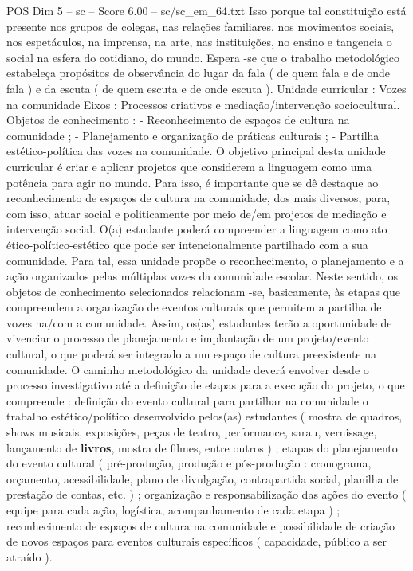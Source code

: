 \begin{textsample}{POS Dim 5 – sc – Score 6.00 – sc/sc\_em\_64.txt}
Isso porque tal constituição está presente nos grupos de colegas, nas relações familiares, nos movimentos sociais, nos espetáculos, na imprensa, na arte, nas instituições, no ensino e tangencia o social na esfera do cotidiano, do mundo.
Espera -se que o trabalho metodológico estabeleça propósitos de observância do lugar da fala ( de quem fala e de onde fala ) e da escuta ( de quem escuta e de onde escuta ).
Unidade curricular : Vozes na comunidade Eixos : Processos criativos e mediação/intervenção sociocultural.
Objetos de conhecimento : - Reconhecimento de espaços de cultura na comunidade ; - Planejamento e organização de práticas culturais ; - Partilha estético-política das vozes na comunidade.
O objetivo principal desta unidade curricular é criar e aplicar projetos que considerem a linguagem como uma potência para agir no mundo.
Para isso, é importante que se dê destaque ao reconhecimento de espaços de cultura na comunidade, dos mais diversos, para, com isso, atuar social e politicamente por meio de/em projetos de mediação e intervenção social.
O(a) estudante poderá compreender a linguagem como ato ético-político-estético que pode ser intencionalmente partilhado com a sua comunidade.
Para tal, essa unidade propõe o reconhecimento, o planejamento e a ação organizados pelas múltiplas vozes da comunidade escolar.
Neste sentido, os objetos de conhecimento selecionados relacionam -se, basicamente, às etapas que compreendem a organização de eventos culturais que permitem a partilha de vozes na/com a comunidade.
Assim, os(as) estudantes terão a oportunidade de vivenciar o processo de planejamento e implantação de um projeto/evento cultural, o que poderá ser integrado a um espaço de cultura preexistente na comunidade.
O caminho metodológico da unidade deverá envolver desde o processo investigativo até a definição de etapas para a execução do projeto, o que compreende : definição do evento cultural para partilhar na comunidade o trabalho estético/político desenvolvido pelos(as) estudantes ( mostra de quadros, shows musicais, exposições, peças de teatro, performance, sarau, vernissage, lançamento de \textbf{livros}, mostra de filmes, entre outros ) ; etapas do planejamento do evento cultural ( pré-produção, produção e pós-produção : cronograma, orçamento, acessibilidade, plano de divulgação, contrapartida social, planilha de prestação de contas, etc. ) ; organização e responsabilização das ações do evento ( equipe para cada ação, logística, acompanhamento de cada etapa ) ; reconhecimento de espaços de cultura na comunidade e possibilidade de criação de novos espaços para eventos culturais específicos ( capacidade, público a ser atraído ).

\end{textsample}
